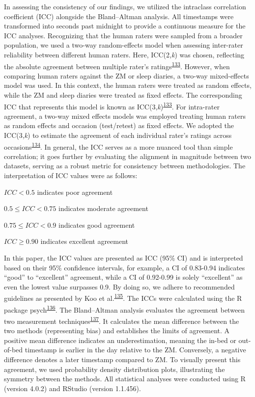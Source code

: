 \documentclass[
  10pt,
]{scrbook}
\begin{document}
In assessing the consistency of our findings, we utilized the intraclass
correlation coefficient (ICC) alongside the Bland--Altman analysis. All
timestamps were transformed into seconds past midnight to provide a
continuous measure for the ICC analyses. Recognizing that the human
raters were sampled from a broader population, we used a two-way
random-effects model when assessing inter-rater reliability between
different human raters. Here, ICC(2,\emph{k}) was chosen, reflecting the
absolute agreement between multiple rater's
ratings\textsuperscript{\protect\hyperlink{ref-shrout_1979}{133}}.
However, when comparing human raters against the ZM or sleep diaries, a
two-way mixed-effects model was used. In this context, the human raters
were treated as random effects, while the ZM and sleep diaries were
treated as fixed effects. The corresponding ICC that represents this
model is known as
ICC(3,\emph{k})\textsuperscript{\protect\hyperlink{ref-shrout_1979}{133}}.
For intra-rater agreement, a two-way mixed effects models was employed
treating human raters as random effects and occasion (test/retest) as
fixed effects. We adopted the ICC(3,\emph{k}) to estimate the agreement
of each individual rater's ratings across
occasions\textsuperscript{\protect\hyperlink{ref-mcgraw_1996}{134}}. In
general, the ICC serves as a more nuanced tool than simple correlation;
it goes further by evaluating the alignment in magnitude between two
datasets, serving as a robust metric for consistency between
methodologies. The interpretation of ICC values were as follows:

\(ICC < 0.5\) indicates poor agreement

\(0.5 ≤ ICC < 0.75\) indicates moderate agreement

\(0.75 ≤ ICC < 0.9\) indicates good agreement

\(ICC ≥ 0.90\) indicates excellent agreement

In this paper, the ICC values are presented as ICC (95\% CI) and is
interpreted based on their 95\% confidence intervals, for example, a CI
of 0.83-0.94 indicates ``good'' to ``excellent'' agreement, while a CI
of 0.92-0.99 is solely ``excellent'' as even the lowest value surpasses
0.9. By doing so, we adhere to recommended guidelines as presented by
Koo et
al.\textsuperscript{\protect\hyperlink{ref-koo_guideline_2016}{135}}.
The ICCs were calculated using the R package
psych\textsuperscript{\protect\hyperlink{ref-psych}{136}}. The
Bland--Altman analysis evaluates the agreement between two measurement
techniques\textsuperscript{\protect\hyperlink{ref-bland_measuring_1999}{137}}.
It calculates the mean difference between the two methods (representing
bias) and establishes the limits of agreement. A positive mean
difference indicates an underestimation, meaning the in-bed or
out-of-bed timestamp is earlier in the day relative to the ZM.
Conversely, a negative difference denotes a later timestamp compared to
ZM. To visually present this agreement, we used probability density
distribution plots, illustrating the symmetry between the methods. All
statistical analyses were conducted using R (version 4.0.2) and RStudio
(version 1.1.456).
\end{document}
